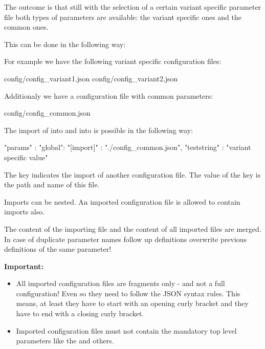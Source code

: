 The outcome is that still with the selection of a certain variant specific parameter file both types of parameters are available:
the variant specific ones and the common ones.

This can be done in the following way:

For example we have the following variant specific configuration files:

\begin{pythonlog}
config/config_variant1.json
config/config_variant2.json
\end{pythonlog}

Additionaly we have a configuration file with common parameters:

\begin{pythonlog}
config/config_common.json
\end{pythonlog}

The import of  into  and into  is possible in the following way:

\begin{pythonlog}
"params" : {
            "global": {
                       "[import]"   : "./config_common.json",
                       "teststring" : "variant specific value"
                      }
           }
\end{pythonlog}

The key \pcode{[import]} indicates the import of another configuration file. The value of the key is the path and name of this file.

Imports can be nested. An imported configuration file is allowed to contain imports also.

The content of the importing file and the content of all imported files are merged. In case of duplicate parameter names follow up definitions
overwrite previous definitions of the same parameter!

\textbf{Important:}

\begin{itemize}
   \item All imported configuration files are fragments only - and not a full configuration! Even so they need to follow the JSON syntax rules.
         This means, at least they have to start with an opening curly bracket and they have to end with a closing curly bracket.
   \item Imported configuration files must not contain the mandatory top level parameters like the  and others.
\end{itemize}

